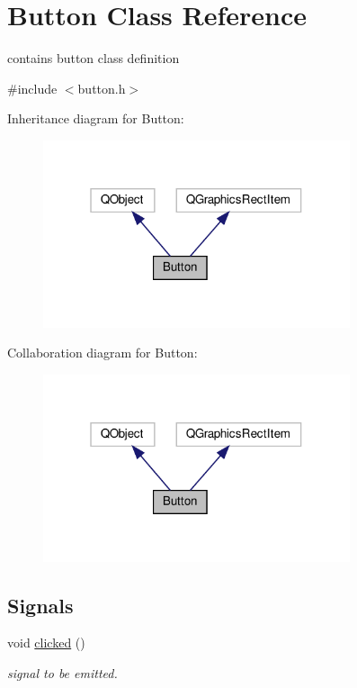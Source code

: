 \hypertarget{classButton}{}\section{Button Class Reference}
\label{classButton}


contains button class definition  




{\ttfamily \#include $<$button.\+h$>$}



Inheritance diagram for Button\+:\nopagebreak
\begin{figure}[H]
\begin{center}
\leavevmode
\includegraphics[width=256pt]{classButton__inherit__graph}
\end{center}
\end{figure}


Collaboration diagram for Button\+:\nopagebreak
\begin{figure}[H]
\begin{center}
\leavevmode
\includegraphics[width=256pt]{classButton__coll__graph}
\end{center}
\end{figure}
\subsection*{Signals}
\begin{DoxyCompactItemize}
\item 
void \hyperlink{classButton_a9e7ab4152cb1e7e3beb7f2842f32670c}{clicked} ()
\begin{DoxyCompactList}\small\item\em signal to be emitted. \end{DoxyCompactList}\end{DoxyCompactItemize}
